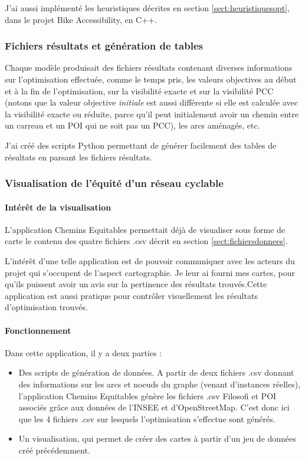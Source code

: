 J'ai aussi implémenté les heuristiques décrites en section \ref{sect:heuristiquesopt}, dans le projet Bike Accessibility, en C++. 

\subsubsection{Fichiers résultats et génération de tables}

Chaque modèle produisait des fichiers résultats contenant diverses informations sur l'optimisation effectuée, comme le temps pris, les valeurs objectives au début et à la fin de l'optimisation, sur la visibilité exacte et sur la visibilité PCC (notons que la valeur objective \emph{initiale} est aussi différente si elle est calculée avec la visibilité exacte ou réduite, parce qu'il peut initialement avoir un chemin entre un carreau et un POI qui ne soit pas un PCC), les arcs aménagés, etc.

J'ai créé des scripts Python permettant de générer facilement des tables de résultats en parsant les fichiers résultats. 


\subsubsection{Visualisation de l'équité d'un réseau cyclable}

\paragraph{Intérêt de la visualisation}

L'application Chemins Equitables permettait déjà de visualiser sous forme de carte le contenu des quatre fichiers .csv décrit en section \ref{sect:fichiersdonnees}.

L'intérêt d'une telle application est de pouvoir communiquer avec les acteurs du projet qui s'occupent de l'aspect cartographie. Je leur ai fourni mes cartes, pour qu'ils puissent avoir un avis sur la pertinence des résultats trouvés.Cette application est aussi pratique pour contrôler visuellement les résultats d'optimisation trouvés.

\paragraph{Fonctionnement}

Dans cette application, il y a deux parties :

\begin{itemize}
    \item Des scripts de génération de données. A partir de deux fichiers .csv donnant des informations sur les arcs et noeuds du graphe (venant d'instances réelles), l'application Chemins Equitables génère les fichiers .csv Filosofi et POI associés grâce aux données de l'INSEE et d'OpenStreetMap. C'est donc ici que les 4 fichiers .csv sur lesquels l'optimisation s'effectue sont générés.
    \item Un visualisation, qui permet de créer des cartes à partir d'un jeu de données créé précédemment. 
\end{itemize}

